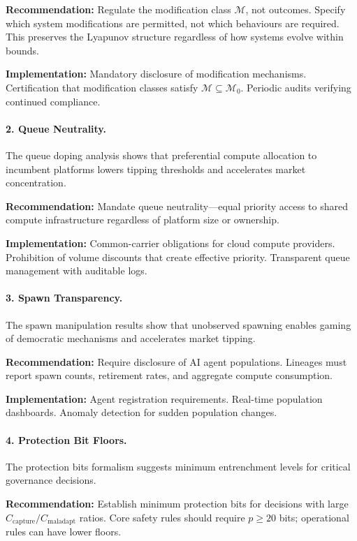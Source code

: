 \documentclass[12pt]{article}
\begin{document}
\textbf{Recommendation:} Regulate the modification class $\mathcal{M}$, not outcomes. Specify which system modifications are permitted, not which behaviours are required. This preserves the Lyapunov structure regardless of how systems evolve within bounds.

\textbf{Implementation:} Mandatory disclosure of modification mechanisms. Certification that modification classes satisfy $\mathcal{M} \subseteq \mathcal{M}_0$. Periodic audits verifying continued compliance.

\paragraph{2. Queue Neutrality.}
The queue doping analysis shows that preferential compute allocation to incumbent platforms lowers tipping thresholds and accelerates market concentration.

\textbf{Recommendation:} Mandate queue neutrality---equal priority access to shared compute infrastructure regardless of platform size or ownership.

\textbf{Implementation:} Common-carrier obligations for cloud compute providers. Prohibition of volume discounts that create effective priority. Transparent queue management with auditable logs.

\paragraph{3. Spawn Transparency.}
The spawn manipulation results show that unobserved spawning enables gaming of democratic mechanisms and accelerates market tipping.

\textbf{Recommendation:} Require disclosure of AI agent populations. Lineages must report spawn counts, retirement rates, and aggregate compute consumption.

\textbf{Implementation:} Agent registration requirements. Real-time population dashboards. Anomaly detection for sudden population changes.

\paragraph{4. Protection Bit Floors.}
The protection bits formalism suggests minimum entrenchment levels for critical governance decisions.

\textbf{Recommendation:} Establish minimum protection bits for decisions with large $C_{\text{capture}} / C_{\text{maladapt}}$ ratios. Core safety rules should require $p \geq 20$ bits; operational rules can have lower floors.
\end{document}
